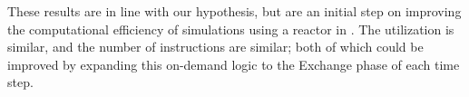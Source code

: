 These results are in line with our hypothesis, but are an initial step on improving the computational efficiency of simulations using a reactor in \cyclus. The utilization is similar, and the number of instructions are similar; both of which could be improved by expanding this on-demand logic to the Exchange phase of each time step.